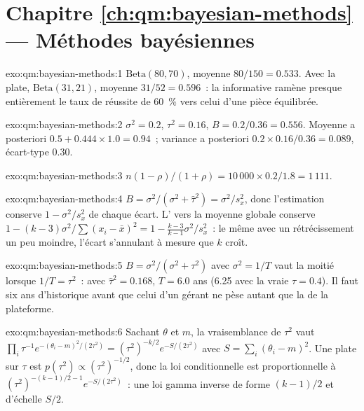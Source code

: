 \section*{Chapitre \ref{ch:qm:bayesian-methods} --- Méthodes bayésiennes}

\begin{solution}{exo:qm:bayesian-methods:1}
$\mathrm{Beta}(80, 70)$, moyenne $80/150 = 0.533$. Avec la  plate, $\mathrm{Beta}(31, 21)$, moyenne $31/52 = 0.596$~: la  informative
ramène presque entièrement le taux de réussite de 60~\% vers celui d'une pièce équilibrée.
\end{solution}

\begin{solution}{exo:qm:bayesian-methods:2}
$\sigma^2 = 0.2$, $\tau^2 = 0.16$, $B = 0.2/0.36 = 0.556$. Moyenne a posteriori $0.5 + 0.444 \times 1.0 = 0.94$~; variance a posteriori $0.2 \times
0.16/0.36 = 0.089$, écart-type 0.30.
\end{solution}

\begin{solution}{exo:qm:bayesian-methods:3}
$n(1 - \rho)/(1 + \rho) = 10\,000 \times 0.2/1.8 = 1\,111$.
\end{solution}

\begin{solution}{exo:qm:bayesian-methods:4}
$B = \sigma^2/(\sigma^2 + \hat\tau^2) = \sigma^2/s_x^2$, donc l'estimation conserve $1 - \sigma^2/s_x^2$ de chaque écart. L' vers la
moyenne globale conserve $1 - (k - 3)\sigma^2/\sum(x_i - \bar x)^2 = 1 - \frac{k-3}{k-1}\sigma^2/s_x^2$~: le même  avec un rétrécissement
un peu moindre, l'écart s'annulant à mesure que $k$ croît.
\end{solution}

\begin{solution}{exo:qm:bayesian-methods:5}
$B = \sigma^2/(\sigma^2 + \tau^2)$ avec $\sigma^2 = 1/T$ vaut la moitié lorsque $1/T = \tau^2$~: avec $\hat\tau^2 = 0.168$, $T = 6.0$ ans (6.25 avec la
vraie $\tau = 0.4$). Il faut six ans d'historique avant que celui d'un gérant ne pèse autant que la  de la plateforme.
\end{solution}

\begin{solution}{exo:qm:bayesian-methods:6}
Sachant $\theta$ et $m$, la vraisemblance de $\tau^2$ vaut $\prod_i\tau^{-1}e^{-(\theta_i - m)^2/(2\tau^2)} = (\tau^2)^{-k/2}e^{-S/(2\tau^2)}$ avec $S =
\sum_i(\theta_i - m)^2$. Une  plate sur $\tau$ est $p(\tau^2) \propto (\tau^2)^{-1/2}$, donc la loi conditionnelle est proportionnelle à
$(\tau^2)^{-(k-1)/2 - 1}e^{-S/(2\tau^2)}$~: une loi gamma inverse de forme $(k - 1)/2$ et d'échelle $S/2$.
\end{solution}

